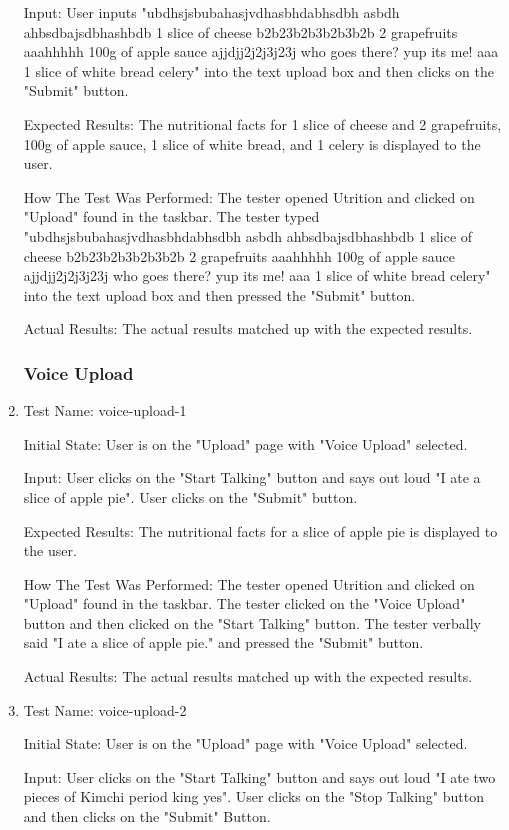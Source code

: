 \documentclass[12pt, titlepage]{article}
\begin{document}
\begin{enumerate}
		Input: User inputs "ubdhsjsbubahasjvdhasbhdabhsdbh asbdh ahbsdbajsdbhashbdb 1 slice of cheese b2b23b2b3b2b3b2b 2 grapefruits aaahhhhh 100g of apple sauce ajjdjj2j2j3j23j who goes there? yup its me! aaa 1 slice of white bread celery" into the text upload box and then clicks on the "Submit" button.
		
		Expected Results: The nutritional facts for 1 slice of cheese and 2 grapefruits, 100g of apple sauce, 1 slice of white bread, and 1 celery is displayed to the user.
		
		How The Test Was Performed: The tester opened Utrition and clicked on "Upload" found in the taskbar. The tester typed "ubdhsjsbubahasjvdhasbhdabhsdbh asbdh ahbsdbajsdbhashbdb 1 slice of cheese b2b23b2b3b2b3b2b 2 grapefruits aaahhhhh 100g of apple sauce ajjdjj2j2j3j23j who goes there? yup its me! aaa 1 slice of white bread celery" into the text upload box and then pressed the "Submit" button.
		
		Actual Results: The actual results matched up with the expected results.
	
	
		\subsubsection{Voice Upload}
		
		\item{Test Name: voice-upload-1}
		
		Initial State: User is on the "Upload" page with "Voice Upload" selected.
		
		Input: User clicks on the "Start Talking" button and says out loud "I ate a slice of apple pie". User clicks on the "Submit" button.
		
		Expected Results: The nutritional facts for a slice of apple pie is displayed to the user.
		
		How The Test Was Performed: The tester opened Utrition and clicked on "Upload" found in the taskbar. The tester clicked on the "Voice Upload" button and then clicked on the "Start Talking" button. The tester verbally said "I ate a slice of apple pie." and pressed the "Submit" button.
		
		Actual Results: The actual results matched up with the expected results.
		
		\item{Test Name: voice-upload-2}
		
		Initial State: User is on the "Upload" page with "Voice Upload" selected.
		
		Input: User clicks on the "Start Talking" button and says out loud "I ate two pieces of Kimchi period king yes". User clicks on the "Stop Talking" button and then clicks on the "Submit" Button.
		

\end{enumerate}
\end{document}

